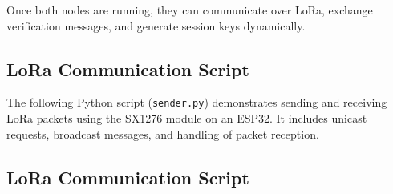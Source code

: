 Once both nodes are running, they can communicate over LoRa, exchange verification messages, and generate session keys dynamically.

\subsection{LoRa Communication Script}

The following Python script (\texttt{sender.py}) demonstrates sending and receiving LoRa packets using the SX1276 module on an ESP32. It includes unicast requests, broadcast messages, and handling of packet reception.

\subsection{LoRa Communication Script}

